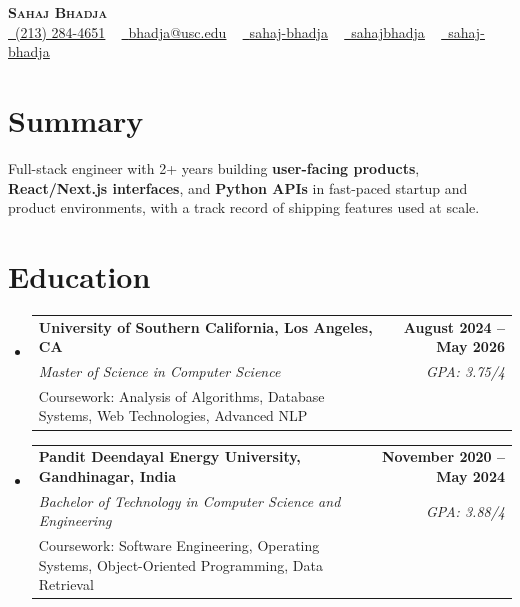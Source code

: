 \documentclass[letterpaper,10pt]{article}
\makeatletter
\newcommand{\resumeEduSubheading}[5]{\vspace{-1pt}\item\begin{tabular*}{1.0\textwidth}[t]{l@{\extracolsep{\fill}}r}\textbf{#1} & \textbf{\small #2} \\\textit{\small #3} & \textit{\small #4} \\\small #5 & \\\end{tabular*}\vspace{-4pt}}
\newcommand{\resumeSubHeadingListStart}{\begin{itemize}[leftmargin=0.0in, label={}]}
\newcommand{\resumeSubHeadingListEnd}{\end{itemize}}
\makeatother
\begin{document}
\begin{center}
{\Huge \scshape \textbf{Sahaj Bhadja}} \\ \vspace{1pt}
\small \href{tel:(213) 284-4651}{\faPhone\ \underline{(213) 284-4651}} ~ \href{mailto: bhadja@usc.edu}{\raisebox{-0.2\height}\faEnvelope\ \underline{bhadja@usc.edu}} ~
\href{https://www.linkedin.com/in/sahaj-bhadja/}{\raisebox{-0.2\height}\faLinkedin\ \underline{sahaj-bhadja}} ~ \href{https://github.com/SAHAJ-BHADJA}{\raisebox{-0.2\height}\faGithub\ \underline{sahajbhadja}} ~
\href{https://sahaj-bhadja.vercel.app/}{\raisebox{-0.2\height}\faGlobe\ \underline{sahaj-bhadja}}
\end{center}
\vspace{-18pt}
\section{Summary}
\begin{itemize}[leftmargin=0.15in, label={}]
\small{\item{Full-stack engineer with 2+ years building \textbf{user-facing products}, \textbf{React/Next.js interfaces}, and \textbf{Python APIs} in fast-paced startup and product environments, with a track record of shipping features used at scale.}}
\end{itemize}
\vspace{-16pt}
\section{Education}
\resumeSubHeadingListStart
\resumeEduSubheading{University of Southern California, Los Angeles, CA}{August 2024 -- May 2026}{Master of Science in Computer Science}{GPA: 3.75/4}{Coursework: Analysis of Algorithms, Database Systems, Web Technologies, Advanced NLP}
\vspace{-9pt}
\resumeEduSubheading{Pandit Deendayal Energy University, Gandhinagar, India}{November 2020 -- May 2024}{Bachelor of Technology in Computer Science and Engineering}{GPA: 3.88/4}{Coursework: Software Engineering, Operating Systems, Object-Oriented Programming, Data Retrieval}
\resumeSubHeadingListEnd
\vspace{-14pt}
\end{document}
